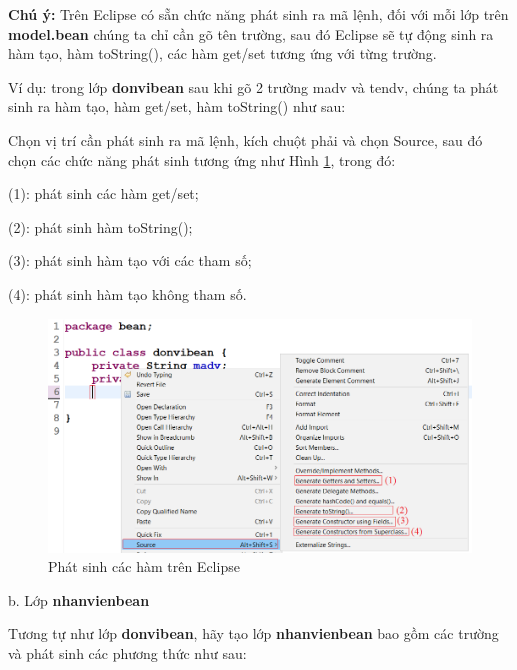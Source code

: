 \textbf{Chú ý:}
Trên Eclipse có sẵn chức năng phát sinh ra mã lệnh, đối với mỗi lớp trên \textbf{model.bean} chúng ta chỉ cần gõ tên trường, sau đó Eclipse sẽ tự động sinh ra hàm tạo, hàm toString(), các hàm get/set tương ứng với từng trường. 

Ví dụ: trong lớp \textbf{donvibean} sau khi gõ 2 trường madv và tendv, chúng ta phát sinh ra hàm tạo, hàm get/set, hàm toString() như sau:

Chọn vị trí cần phát sinh ra mã lệnh, kích chuột phải và chọn Source, sau đó chọn các chức năng phát sinh tương ứng như Hình \ref{hinh320}, trong đó:

(1): phát sinh các hàm get/set;

(2): phát sinh hàm toString();

(3): phát sinh hàm tạo với các tham số;

(4): phát sinh hàm tạo không tham số.

\begin{figure}[!ht]
	\centering
	\includegraphics[scale=0.6]{Figures//Hinh320.png}
	\caption{ Phát sinh các hàm trên Eclipse }\label{hinh320} 
\end{figure}

b. Lớp \textbf{nhanvienbean}

Tương tự như lớp \textbf{donvibean}, hãy tạo lớp \textbf{nhanvienbean} bao gồm các trường và phát sinh các phương thức như sau:


